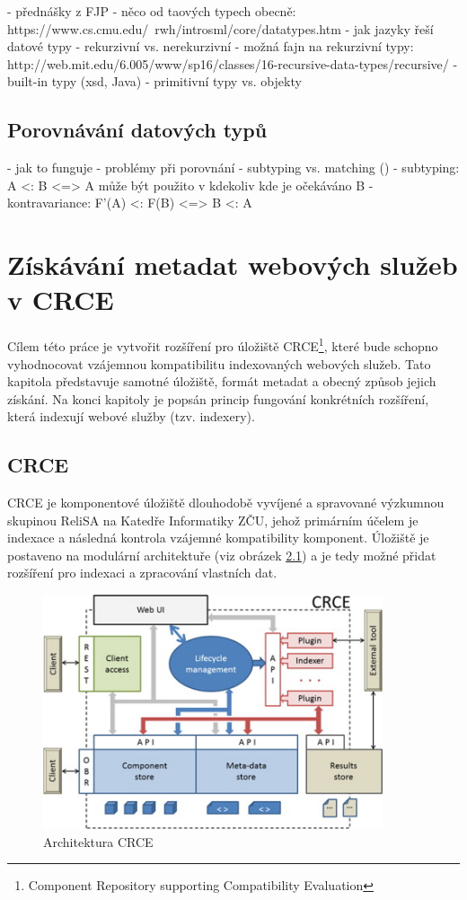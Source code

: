 \documentclass[czech,DP]{thesiskiv}
\begin{document}
- přednášky z FJP
- něco od taových typech obecně: https://www.cs.cmu.edu/~rwh/introsml/core/datatypes.htm
- jak jazyky řeší datové typy
	- rekurzivní vs. nerekurzivní
	- možná fajn na rekurzivní typy: http://web.mit.edu/6.005/www/sp16/classes/16-recursive-data-types/recursive/
- built-in typy (xsd, Java)
- primitivní typy vs. objekty

\section{Porovnávání datových typů}

 - jak to funguje
 - problémy při porovnání
 - subtyping vs. matching (\cite{abadi1995subytping})
 - subtyping: A <: B <=> A může být použito v kdekoliv kde je očekáváno B
 - kontravariance: F'(A) <: F(B) <=> B <: A


\chapter{Získávání metadat webových služeb v CRCE}
\label{sec:crce}

Cílem této práce je vytvořit rozšíření pro úložiště CRCE\footnote{Component Repository supporting Compatibility Evaluation}, které bude schopno vyhodnocovat vzájemnou kompatibilitu indexovaných webových služeb. Tato kapitola představuje samotné úložiště, formát metadat a obecný způsob jejich získání. Na konci kapitoly je popsán princip fungování konkrétních rozšíření, která indexují webové služby (tzv. indexery).

\section{CRCE}

CRCE je komponentové úložiště dlouhodobě vyvíjené a spravované výzkumnou skupinou ReliSA na Katedře Informatiky ZČU, jehož primárním účelem je indexace a následná kontrola vzájemné kompatibility komponent. Úložiště je postaveno na modulární architektuře (viz obrázek \ref{fig:crce-arch}) a je tedy možné přidat rozšíření pro indexaci a zpracování vlastních dat.

\begin{figure}[h]
	\centering
	\includegraphics[width=10cm]{crce-arch.jpg}
	\caption{Architektura CRCE}
	\label{fig:crce-arch}
\end{figure} 
\end{document}

